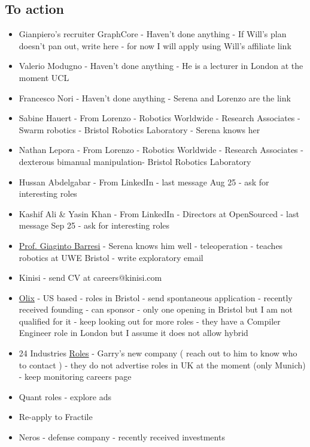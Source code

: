 \subsection*{To action}
\begin{itemize}
\item
    Gianpiero's recruiter GraphCore - Haven't done anything - If Will's plan
    doesn't pan out, write here - for now I will apply using Will's affiliate link
\item
    Valerio Modugno - Haven't done anything - He is a lecturer in London at the moment UCL
\item
    Francesco Nori - Haven't done anything - Serena and Lorenzo are the link
\item 
    Sabine Hauert - From Lorenzo - Robotics Worldwide - Research Associates
    - Swarm robotics - Bristol Robotics Laboratory - Serena knows her
\item
    Nathan Lepora - From Lorenzo - Robotics Worldwide - Research Associates
    - dexterous bimanual manipulation- Bristol Robotics Laboratory
\item
    Hussan Abdelgabar - From LinkedIn - last message Aug 25 - ask for interesting roles
\item
    Kashif Ali \& Yasin Khan - From LinkedIn - Directors at OpenSourced
    - last message Sep 25 - ask for interesting roles
\item
    \href{https://www.bristolroboticslab.com/Core-Staff}{Prof. Giaginto Barresi}
    - Serena knows him well - teleoperation - teaches robotics at UWE Bristol
    - write exploratory email
\item
   Kinisi - send CV at careers@kinisi.com
 \item
   \href{https://olix.com/careers#open-roles}{Olix} - US based - roles in
    Bristol - send spontaneous application - recently received founding - can
    sponsor - only one opening in Bristol but I am not qualified for it - keep
    looking out for more roles - they have a Compiler Engineer role in London
    but I assume it does not allow hybrid
  \item 24 Industries
    \href{https://twentyfour-industries.jobs.personio.com/?language=en}{Roles} -
    Garry's new company ( reach out to him to know who to contact ) - they do
    not advertise roles in UK at the moment (only Munich) - keep monitoring
    careers page

  \item Quant roles - explore ads
  \item Re-apply to Fractile
  \item Neros - defense company - recently received investments
\end{itemize}

